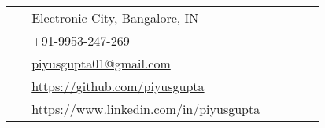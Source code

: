 \documentclass[10pt]{article} %
\begin{document}
\begin{paracol}{2}
\vspace{-\baselineskip}\medskip %

\medskip %


\switchcolumn %


\parbox[top][0.12\textheight][c]{\linewidth}{ %
	\vspace{-0.04\textheight} %
	\colorbox{shade}{ %
		\begin{supertabular}{p{0.05\linewidth}|p{0.775\linewidth}} %
            \raisebox{-1pt}{\faHome} & Electronic City, Bangalore, IN \\ %
			\raisebox{-1pt}{\faPhone} & +91-9953-247-269 \\ %
			\raisebox{0pt}{\small\faEnvelope} & \href{mailto:piyusgupta01@gmail.com}{piyusgupta01@gmail.com} \\ %
			\raisebox{-1pt}{\faGithub} & \href{https://github.com/piyusgupta}{https://github.com/piyusgupta} \\ %
			\raisebox{-1pt}{\faLinkedinSquare} & \href{https://www.linkedin.com/in/piyusgupta}{https://www.linkedin.com/in/piyusgupta} \\ %
		\end{supertabular}
	}
}



\end{paracol}
\end{document}
